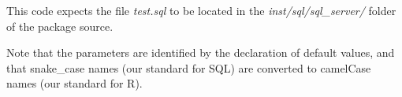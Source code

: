 \documentclass[
]{article}
\begin{document}
This code expects the file \emph{test.sql} to be located in the
\emph{inst/sql/sql\_server/} folder of the package source.

Note that the parameters are identified by the declaration of default
values, and that snake\_case names (our standard for SQL) are converted
to camelCase names (our standard for R).
\end{document}
